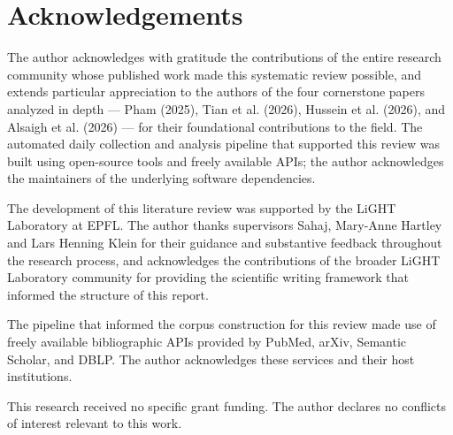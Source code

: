 
\section*{Acknowledgements}
\label{sec:acknowledgements}

The author acknowledges with gratitude the contributions of the entire research
community whose published work made this systematic review possible, and
extends particular appreciation to the authors of the four cornerstone papers
analyzed in depth — Pham (2025), Tian et al. (2026), Hussein et al. (2026),
and Alsaigh et al. (2026) — for their foundational contributions to the field.
The automated daily collection and analysis pipeline that supported this review
was built using open-source tools and freely available APIs; the author
acknowledges the maintainers of the underlying software dependencies.

The development of this literature review was supported by the LiGHT Laboratory
at EPFL. The author thanks supervisors Sahaj, Mary-Anne Hartley and Lars Henning Klein for
their guidance and substantive feedback throughout the research process, and
acknowledges the contributions of the broader LiGHT Laboratory community for
providing the scientific writing framework that informed the structure of
this report.

The pipeline that informed the corpus construction for this review made use of
freely available bibliographic APIs provided by PubMed, arXiv, Semantic Scholar,
and DBLP. The author acknowledges these services and their host institutions.

This research received no specific grant funding. The author declares no
conflicts of interest relevant to this work.